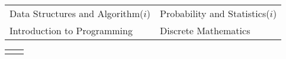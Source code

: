 

{\fontsize{11pt}{1em}\bodyfontlight\upshape\color{text}
\begin{tabular*}{\textwidth}{L{\textwidth/2 - 1cm} L{\textwidth/2 -1cm}}
  Data Structures and Algorithm($i$) & Probability and Statistics($i$)\\ 
  Introduction to Programming &  Discrete Mathematics \\
\end{tabular*}
}
{\fontsize{11pt}{1em}\footerfont\upshape\color{text}
\begin{tabular*}{\textwidth}{L{8.4cm} L{3cm}}
\\
\end{tabular*}
}

